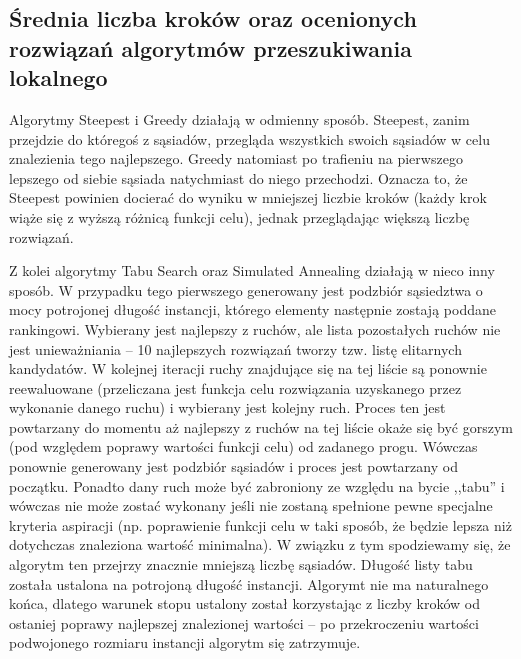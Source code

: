 \subsection{Średnia liczba kroków oraz ocenionych rozwiązań algorytmów przeszukiwania lokalnego}
Algorytmy Steepest i Greedy działają w odmienny sposób. Steepest, zanim przejdzie do któregoś z sąsiadów, przegląda wszystkich swoich sąsiadów w celu znalezienia tego najlepszego. Greedy natomiast po trafieniu na pierwszego lepszego od siebie sąsiada natychmiast do niego przechodzi. Oznacza to, że Steepest powinien docierać do wyniku w mniejszej liczbie kroków (każdy krok wiąże się z wyższą różnicą funkcji celu), jednak przeglądając większą liczbę rozwiązań.

Z kolei algorytmy Tabu Search oraz Simulated Annealing działają w nieco inny sposób. W przypadku tego pierwszego generowany jest podzbiór sąsiedztwa o mocy potrojonej długość instancji, którego elementy następnie zostają poddane rankingowi. Wybierany jest najlepszy z ruchów, ale lista pozostałych ruchów nie jest unieważniania -- 10 najlepszych rozwiązań tworzy tzw. listę elitarnych kandydatów. W kolejnej iteracji ruchy znajdujące się na tej liście są ponownie reewaluowane (przeliczana jest funkcja celu rozwiązania uzyskanego przez wykonanie danego ruchu) i wybierany jest kolejny ruch. Proces ten jest powtarzany do momentu aż najlepszy z ruchów na tej liście okaże się być gorszym (pod względem poprawy wartości funkcji celu) od zadanego progu. Wówczas ponownie generowany jest podzbiór sąsiadów i proces jest powtarzany od początku. Ponadto dany ruch może być zabroniony ze względu na bycie ,,tabu'' i wówczas nie może zostać wykonany jeśli nie zostaną spełnione pewne specjalne kryteria aspiracji (np. poprawienie funkcji celu w taki sposób, że będzie lepsza niż dotychczas znaleziona wartość minimalna). W związku z tym spodziewamy się, że algorytm ten przejrzy znacznie mniejszą liczbę sąsiadów. Długość listy tabu została ustalona na potrojoną długość instancji. Algorymt nie ma naturalnego końca, dlatego warunek stopu ustalony został korzystając z liczby kroków od ostaniej poprawy najlepszej znalezionej wartości -- po przekroczeniu wartości podwojonego rozmiaru instancji algorytm się zatrzymuje.

